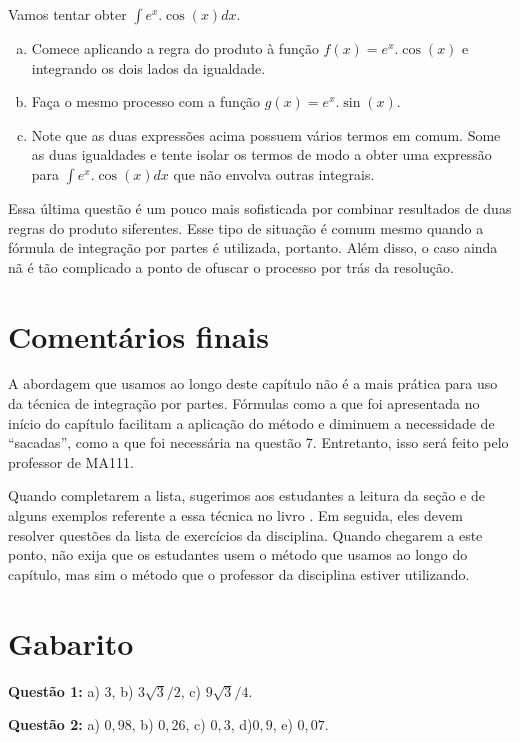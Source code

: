 \documentclass[main_estudante.tex]{subfiles}
\begin{document}
\begin{questao}
Vamos tentar obter $\int e^x.\cos(x) dx$.
\begin{enumerate}[a)]
\item Comece aplicando a regra do produto à função $f(x)=e^x.\cos(x)$ e integrando os dois lados da igualdade.
\item Faça o mesmo processo com a função $g(x)=e^x.\sin(x)$.
\item Note que as duas expressões acima possuem vários termos em comum. Some as duas igualdades e tente isolar os termos de modo a obter uma expressão para $\int e^x.\cos(x) dx$ que não envolva outras integrais.
\end{enumerate}
\end{questao}

Essa última questão é um pouco mais sofisticada por combinar resultados de duas regras do produto siferentes. Esse tipo de situação é comum mesmo quando a fórmula de integração por partes é utilizada, portanto. Além disso, o caso ainda nã é tão complicado a ponto de ofuscar o processo por trás da resolução.

\section{Comentários finais}

A abordagem que usamos ao longo deste capítulo não é a mais prática para uso da técnica de integração por partes. Fórmulas como a que foi apresentada no início do capítulo facilitam a aplicação do método e diminuem a necessidade de ``sacadas'', como a que foi necessária na questão 7. Entretanto, isso será feito pelo professor de MA111.

Quando completarem a lista, sugerimos aos estudantes a leitura da seção e de alguns exemplos referente a essa técnica no livro . Em seguida, eles devem resolver questões da lista de exercícios da disciplina. Quando chegarem a este ponto, não exija que os estudantes usem o método que usamos ao longo do capítulo, mas sim o método que o professor da disciplina estiver utilizando.

\section{Gabarito}

\noindent\textbf{Questão 1:} a) $3$, b) $3\sqrt{3}/2$, c) $9\sqrt{3}/4$.

\noindent\textbf{Questão 2:} a) $0,98$, b) $0,26$, c) $0,3$, d)$0,9$, e) $0,07$.
\end{document}
